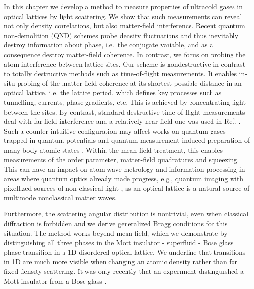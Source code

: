 In this chapter we develop a method to measure properties of ultracold
gases in optical lattices by light scattering. We show that such
measurements can reveal not only density correlations, but also
matter-field interference.  Recent quantum non-demolition (QND)
schemes \cite{rogers2014, mekhov2007prl, eckert2008} probe density
fluctuations and thus inevitably destroy information about phase,
i.e.~the conjugate variable, and as a consequence destroy matter-field
coherence. In contrast, we focus on probing the atom interference
between lattice sites. Our scheme is nondestructive in contrast to
totally destructive methods such as time-of-flight measurements. It
enables in-situ probing of the matter-field coherence at its shortest
possible distance in an optical lattice, i.e. the lattice period,
which defines key processes such as tunnelling, currents, phase
gradients, etc. This is achieved by concentrating light between the
sites. By contrast, standard destructive time-of-flight measurements
deal with far-field interference and a relatively near-field one was
used in Ref. \cite{miyake2011}. Such a counter-intuitive configuration
may affect works on quantum gases trapped in quantum potentials
\cite{mekhov2012, mekhov2008, larson2008, chen2009, habibian2013,
  ivanov2014, caballero2015} and quantum measurement-induced
preparation of many-body atomic states \cite{mazzucchi2016,
  mekhov2009prl, pedersen2014, elliott2015}. Within the mean-field
treatment, this enables measurements of the order parameter,
matter-field quadratures and squeezing. This can have an impact on
atom-wave metrology and information processing in areas where quantum
optics already made progress, e.g., quantum imaging with pixellized
sources of non-classical light \cite{golubev2010, kolobov1999}, as an
optical lattice is a natural source of multimode nonclassical matter
waves.

Furthermore, the scattering angular distribution is nontrivial, even
when classical diffraction is forbidden and we derive generalized
Bragg conditions for this situation. The method works beyond
mean-field, which we demonstrate by distinguishing all three phases in
the Mott insulator - superfluid - Bose glass phase transition in a 1D
disordered optical lattice. We underline that transitions in 1D are
much more visible when changing an atomic density rather than for
fixed-density scattering. It was only recently that an experiment
distinguished a Mott insulator from a Bose glass \cite{derrico2014}.

